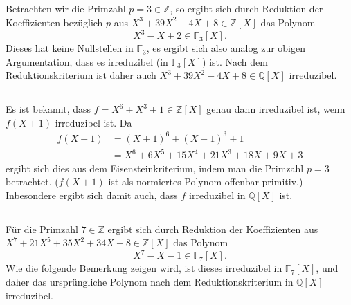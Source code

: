 \documentclass[a4paper,10pt]{article}
\theoremstyle{definition}
\newcommand{\Z}{\mathbb{Z}}
\newcommand{\Q}{\mathbb{Q}}
\newcommand{\F}{\mathbb{F}}
\begin{document}
\subsection{}
Betrachten wir die Primzahl $p = 3 \in \Z$, so ergibt sich durch Reduktion der Koeffizienten bezüglich $p$ aus $X^3 +39X^2 -4X +8 \in \Z[X]$ das Polynom
\[
 X^3 -X +2 \in \F_3[X].
\]
Dieses hat keine Nullstellen in $\F_3$, es ergibt sich also analog zur obigen Argumentation, dass es irreduzibel (in $\F_3[X]$) ist. Nach dem Reduktionskriterium ist daher auch $X^3 +39X^2 -4X +8 \in \Q[X]$ irreduzibel.



\subsection{}
Es ist bekannt, dass $f = X^6+X^3+1 \in \Z[X]$ genau dann irreduzibel ist, wenn $f(X+1)$ irreduzibel ist. Da
\begin{align*}
 f(X+1) &= (X+1)^6+(X+1)^3+1 \\
        &= X^6 + 6X^5 + 15X^4 + 21X^3 + 18X + 9X + 3
\end{align*}
ergibt sich dies aus dem Eisensteinkriterium, indem man die Primzahl $p = 3$ betrachtet. ($f(X+1)$ ist als normiertes Polynom offenbar primitiv.) Inbesondere ergibt sich damit auch, dass $f$ irreduzibel in $\Q[X]$ ist.


\subsection{}
Für die Primzahl $7 \in \Z$ ergibt sich durch Reduktion der Koeffizienten aus $X^7 + 21X^5 + 35X^2 +34X -8 \in \Z[X]$ das Polynom
\[
 X^7 -X -1 \in \F_7[X].
\]
Wie die folgende Bemerkung zeigen wird, ist dieses irreduzibel in $\F_7[X]$, und daher das ursprüngliche Polynom nach dem Reduktionskriterium in $\Q[X]$ irreduzibel.
\end{document}
